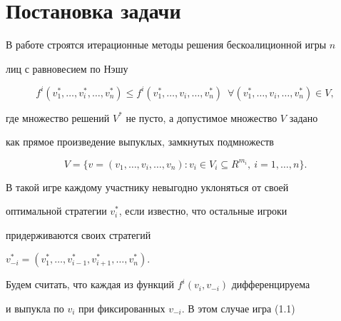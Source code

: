  




\maketitle 


\label{begin} 


 


\section{Постановка задачи} 


 


В работе строятся итерационные методы решения бескоалиционной игры $n$ 


лиц с равновесием по Нэшу 


\begin{equation} 


f^i(v^*_1,\dotsc,v^*_i,\dotsc,v^*_n)\le f^i 


(v^*_1,\dotsc,v_i,\dotsc,v^*_n) 


\ \;\forall(v^*_1,\dotsc,v_i,\dotsc,v^*_n)\in V, 


\end{equation} 


где множество решений $V^*$ не пусто, а допустимое множество $V$ задано 


как прямое произведение выпуклых, замкнутых подмножеств 


$$ 


V=\{v=(v_1,\dotsc,v_i,\dotsc,v_n): 


v_i\in V_i\subseteq R^{m_i},\ i=1,\dotsc,n\}. 


$$ 


В такой игре каждому участнику невыгодно уклоняться от своей 


оптимальной стратегии $v^*_i$, если известно, что остальные игроки 


придерживаются своих стратегий 


$v^*_{-i}=(v^*_1,\dotsc,v^*_{i-1},v^*_{i+1},\dotsc,v^*_n)$. 


 


Будем считать, что каждая из функций $f^i(v_i,v_{-i})$ дифференцируема 


и выпукла по $v_i$ при фиксированных $v_{-i}$. В этом случае игра (1.1) 


